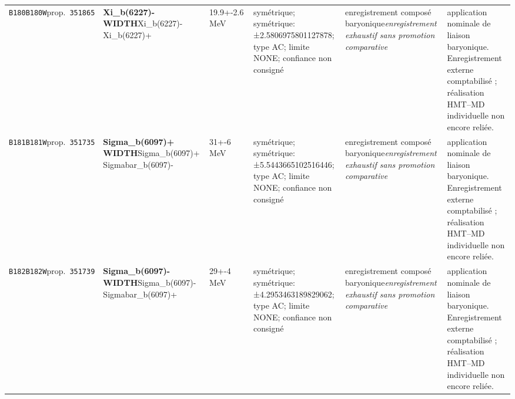 \begin{landscape}
\begin{longtable}{L{1.85cm}L{4.45cm}L{2.35cm}L{4.05cm}L{3.35cm}L{7.15cm}}
\texttt{B180}\newline \texttt{B180W}\newline prop.\ \texttt{351865} & \textbf{Xi\_\allowbreak{}b(6227)- WIDTH}\newline Xi\_\allowbreak{}b(6227)- \textbar{}\allowbreak{} Xi\_\allowbreak{}b(6227)+ & 19.9+-2.6\,MeV & symétrique; symétrique: ±2.5806975801127878; type AC; limite NONE; confiance non consigné & enregistrement composé baryonique\newline \emph{enregistrement exhaustif sans promotion comparative} & application nominale de liaison baryonique. Enregistrement externe comptabilisé ; réalisation HMT--MD individuelle non encore reliée. \\
\texttt{B181}\newline \texttt{B181W}\newline prop.\ \texttt{351735} & \textbf{Sigma\_\allowbreak{}b(6097)+ WIDTH}\newline Sigma\_\allowbreak{}b(6097)+ \textbar{}\allowbreak{} Sigmabar\_\allowbreak{}b(6097)- & 31+-6\,MeV & symétrique; symétrique: ±5.5443665102516446; type AC; limite NONE; confiance non consigné & enregistrement composé baryonique\newline \emph{enregistrement exhaustif sans promotion comparative} & application nominale de liaison baryonique. Enregistrement externe comptabilisé ; réalisation HMT--MD individuelle non encore reliée. \\
\texttt{B182}\newline \texttt{B182W}\newline prop.\ \texttt{351739} & \textbf{Sigma\_\allowbreak{}b(6097)- WIDTH}\newline Sigma\_\allowbreak{}b(6097)- \textbar{}\allowbreak{} Sigmabar\_\allowbreak{}b(6097)+ & 29+-4\,MeV & symétrique; symétrique: ±4.2953463189829062; type AC; limite NONE; confiance non consigné & enregistrement composé baryonique\newline \emph{enregistrement exhaustif sans promotion comparative} & application nominale de liaison baryonique. Enregistrement externe comptabilisé ; réalisation HMT--MD individuelle non encore reliée. \\

\end{longtable}
\end{landscape}
